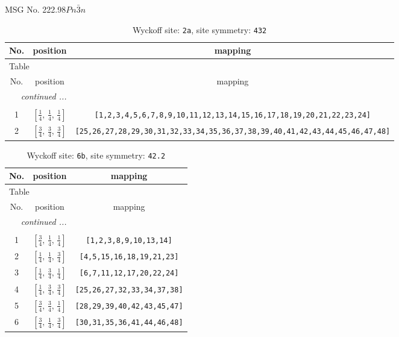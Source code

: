 \documentclass[fleqn,8pt]{jsarticle}
\begin{document}
\setcounter{MaxMatrixCols}{32}

\renewcommand{\tablename}{Table~}
\renewcommand{\figurename}{Figure~}
\begin{center}
\LARGE
MSG No. 222.98\quad$Pn\bar{3}n$
\end{center}
\renewcommand{\arraystretch}{1.2}
\begin{longtable}{ccc}
\caption{Wyckoff site: {\tt 2a}, site symmetry: {\tt 432}}
 \\
 \hline \hline
No. & position & mapping \\ \hline \endfirsthead

\multicolumn{2}{l}{\tablename\ \thetable{}} \\
 \hline \hline
No. & position & mapping \\ \hline \endhead

 \hline \hline
\multicolumn{2}{r}{\footnotesize\it continued ...} \\ \endfoot

 \hline \hline
\multicolumn{2}{r}{} \\ \endlastfoot

1 & $\left[ \frac{1}{4},\, \frac{1}{4},\, \frac{1}{4} \right]$ & {\tt [1,2,3,4,5,6,7,8,9,10,11,12,13,14,15,16,17,18,19,20,21,22,23,24]} \\ \hline
2 & $\left[ \frac{3}{4},\, \frac{3}{4},\, \frac{3}{4} \right]$ & {\tt [25,26,27,28,29,30,31,32,33,34,35,36,37,38,39,40,41,42,43,44,45,46,47,48]} \\
\end{longtable}
\renewcommand{\arraystretch}{1.2}
\begin{longtable}{ccc}
\caption{Wyckoff site: {\tt 6b}, site symmetry: {\tt 42.2}}
 \\
 \hline \hline
No. & position & mapping \\ \hline \endfirsthead

\multicolumn{2}{l}{\tablename\ \thetable{}} \\
 \hline \hline
No. & position & mapping \\ \hline \endhead

 \hline \hline
\multicolumn{2}{r}{\footnotesize\it continued ...} \\ \endfoot

 \hline \hline
\multicolumn{2}{r}{} \\ \endlastfoot

1 & $\left[ \frac{3}{4},\, \frac{1}{4},\, \frac{1}{4} \right]$ & {\tt [1,2,3,8,9,10,13,14]} \\ \hline
2 & $\left[ \frac{1}{4},\, \frac{1}{4},\, \frac{3}{4} \right]$ & {\tt [4,5,15,16,18,19,21,23]} \\ \hline
3 & $\left[ \frac{1}{4},\, \frac{3}{4},\, \frac{1}{4} \right]$ & {\tt [6,7,11,12,17,20,22,24]} \\ \hline
4 & $\left[ \frac{1}{4},\, \frac{3}{4},\, \frac{3}{4} \right]$ & {\tt [25,26,27,32,33,34,37,38]} \\ \hline
5 & $\left[ \frac{3}{4},\, \frac{3}{4},\, \frac{1}{4} \right]$ & {\tt [28,29,39,40,42,43,45,47]} \\ \hline
6 & $\left[ \frac{3}{4},\, \frac{1}{4},\, \frac{3}{4} \right]$ & {\tt [30,31,35,36,41,44,46,48]} \\
\end{longtable}
\end{document}
